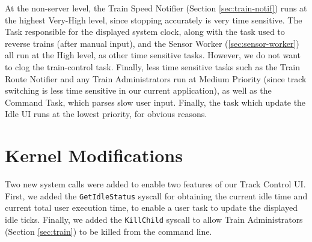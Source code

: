 \documentclass[12pt, titlepage]{article}
\begin{document}
    At the non-server level, the Train Speed Notifier (Section \ref{sec:train-notif}) runs at the highest Very-High level, since stopping accurately is very time sensitive. The Task responsible for the displayed system clock, along with the task used to reverse trains (after manual input), and the Sensor Worker (\ref{sec:sensor-worker}) all run at the High level, as other time sensitive tasks. However, we do not want to clog the train-control task. Finally, less time sensitive tasks such as the Train Route Notifier and any Train Administrators run at Medium Priority (since track switching is less time sensitive in our current application), as well as the Command Task, which parses slow user input. Finally, the task which update the Idle UI runs at the lowest priority, for obvious reasons.

    \section{Kernel Modifications}

    Two new system calls were added to enable two features of our Track Control UI. First, we added the \verb`GetIdleStatus` syscall for obtaining the current idle time and current total user execution time, to enable a user task to update the displayed idle ticks. Finally, we added the \verb`KillChild` syscall to allow Train Administrators (Section \ref{sec:train}) to be killed from the command line.
\end{document}
